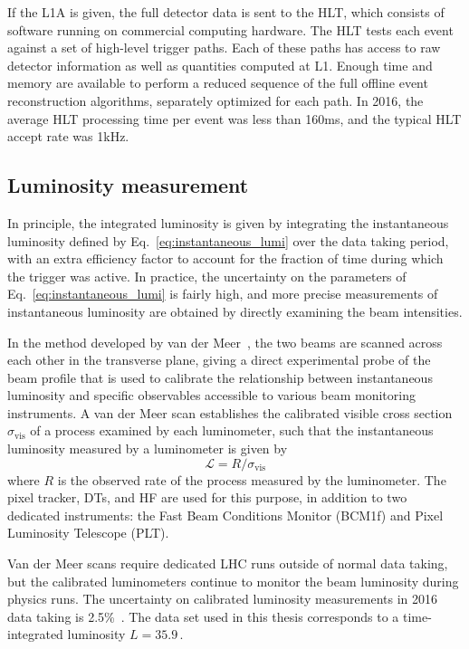 If the L1A is given, the full detector data is sent to the HLT, which consists of software running on commercial computing hardware.
The HLT tests each event against a set of high-level trigger paths. Each of these paths has access to raw detector information as well
as quantities computed at L1. Enough time and memory are available to perform a reduced sequence of the full offline event reconstruction
algorithms, separately optimized for each path. In 2016, the average HLT processing time per event was less than 160\unit{ms},
and the typical HLT accept rate was 1\unit{kHz}.

\subsection{Luminosity measurement} \label{sec:LHCCMS_CMS_lumi}
In principle, the integrated luminosity is given by integrating the instantaneous luminosity defined by Eq.~\ref{eq:instantaneous_lumi} over the data taking period,
with an extra efficiency factor to account for the fraction of time during which the trigger was active. In practice, the uncertainty on the
parameters of Eq.~\ref{eq:instantaneous_lumi} is fairly high, and more precise measurements of instantaneous luminosity are obtained by directly examining the beam intensities.

In the method developed
by van der Meer~\cite{ref:CERN-ISR-PO-68-31}, the two beams are scanned across each other in the transverse plane, giving a direct experimental
probe of the beam profile that is used to calibrate the relationship between instantaneous luminosity and specific observables accessible to various
beam monitoring instruments. A van der Meer scan establishes the calibrated visible cross section $\sigma_\mathrm{vis}$ of a process examined
by each luminometer, such that the instantaneous luminosity measured by a luminometer is given by
\begin{equation}
\mathcal{L} = R / \sigma_\mathrm{vis}
\label{eq:lumi_calibration}
\end{equation}
where $R$ is the observed rate of the process measured by the luminometer. The pixel tracker, DTs, and HF are used for this purpose, in addition to two
dedicated instruments: the Fast Beam Conditions Monitor (BCM1f) and Pixel Luminosity Telescope (PLT).

Van der Meer scans require dedicated LHC runs outside of normal data taking, but the calibrated luminometers continue to monitor the beam luminosity
during physics runs. The uncertainty on calibrated luminosity measurements in 2016 data taking is 2.5\%~\cite{ref:CMS-PAS-LUM-17-001}.
The data set used in this thesis corresponds to a time-integrated luminosity $L = 35.9$\,\fbinv.
